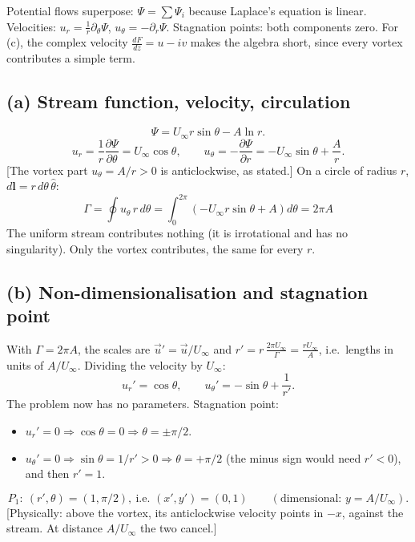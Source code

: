 \documentclass[11pt]{article}
\newcommand{\pd}{\partial}
\newcommand{\why}[1]{{\color{gray}\small[#1]}}
\begin{document}
\begin{strategy}
Potential flows superpose: $\Psi=\sum\Psi_i$ because Laplace's equation is linear. Velocities: $u_r=\frac1r\pd_\theta\Psi$, $u_\theta=-\pd_r\Psi$. Stagnation points: both components zero. For (c), the complex velocity $\frac{dF}{dz}=u-iv$ makes the algebra short, since every vortex contributes a simple term.
\end{strategy}

\subsection*{(a) Stream function, velocity, circulation}
\[
\Psi=U_\infty r\sin\theta-A\ln r .
\]
\[
u_r=\frac1r\frac{\pd\Psi}{\pd\theta}=U_\infty\cos\theta,\qquad
u_\theta=-\frac{\pd\Psi}{\pd r}=-U_\infty\sin\theta+\frac{A}{r}.
\]
\why{The vortex part $u_\theta=A/r>0$ is anticlockwise, as stated.}
On a circle of radius $r$, $d\mathbf l=r\,d\theta\,\hat\theta$:
\[
\Gamma=\oint u_\theta\,r\,d\theta=\int_0^{2\pi}\left(-U_\infty r\sin\theta+A\right)d\theta=\boxed{2\pi A}
\]
The uniform stream contributes nothing (it is irrotational and has no singularity). Only the vortex contributes, the same for every $r$.

\subsection*{(b) Non-dimensionalisation and stagnation point}
With $\Gamma=2\pi A$, the scales are $\vec u'=\vec u/U_\infty$ and $r'=r\,\frac{2\pi U_\infty}{\Gamma}=\frac{rU_\infty}{A}$, i.e.\ lengths in units of $A/U_\infty$. Dividing the velocity by $U_\infty$:
\[
u_r'=\cos\theta,\qquad u_\theta'=-\sin\theta+\frac{1}{r'} .
\]
The problem now has no parameters. Stagnation point:
\begin{itemize}
\item $u_r'=0\Rightarrow\cos\theta=0\Rightarrow\theta=\pm\pi/2$.
\item $u_\theta'=0\Rightarrow\sin\theta=1/r'>0\Rightarrow\theta=+\pi/2$ (the minus sign would need $r'<0$), and then $r'=1$.
\end{itemize}
\[
\boxed{P_1:\ (r',\theta)=(1,\pi/2),\ \text{i.e. }(x',y')=(0,1)}\qquad\left(\text{dimensional: }y=A/U_\infty\right).
\]
\why{Physically: above the vortex, its anticlockwise velocity points in $-x$, against the stream. At distance $A/U_\infty$ the two cancel.}
\end{document}
